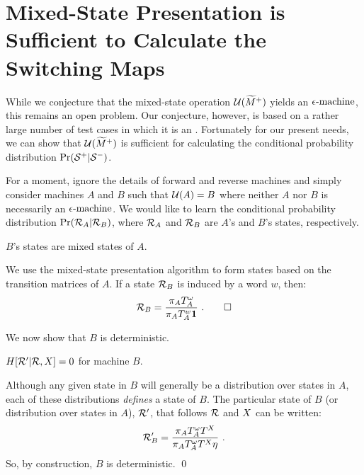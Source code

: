\ifx\master\undefined\fi


\chapter{Mixed-State Presentation is Sufficient to
Calculate the Switching Maps}
\label{app:EFromMixedState}

While we conjecture that the mixed-state operation $\mathcal{U}(\widetilde{M}^+)$
yields an $\mbox{$\epsilon$-machine}$, this remains an open problem. Our conjecture, however, is
based on a rather large number of test cases in which it is an \eM.
Fortunately for our present needs, we can show that
$\mathcal{U}(\widetilde{M}^+)$ is sufficient for
calculating the conditional probability distribution
$\Pr({\mathcal{S}}^{+} | {\mathcal{S}}^{-})$.

For a moment, ignore the details of forward and reverse machines and simply
consider machines $A$ and $B$ such that $\mathcal{U}(A) = B$ where neither $A$ nor $B$ is
necessarily an $\mbox{$\epsilon$-machine}$. We would like to learn the conditional probability
distribution $\Pr(\mathcal{R}_A | \mathcal{R}_B)$, where
$\mathcal{R}_A$ and $\mathcal{R}_B$ are $A$'s and $B$'s states,
respectively.

\begin{Prop}
$B$'s states are mixed states of $A$.
\end{Prop}

\begin{ProProp}
We use the mixed-state presentation algorithm to form states based on the
transition matrices of $A$. If a state $\mathcal{R}_B$ is induced by a
word $w$, then:
\begin{align*}
\mathcal{R}_B = \frac{\pi_A T_A^{\omega}}{\pi_A T_A^{w} \mathbf{1}} ~.
\qed
\end{align*}
\end{ProProp}

We now show that $B$ is deterministic.

\begin{Prop}
$H[\mathcal{R}' | \mathcal{R}, {X}] = 0$ for machine $B$.
\end{Prop}

\begin{ProProp}
Although any given state in $B$ will generally be a distribution over states
in $A$, each of these distributions \emph{defines} a state of $B$. The
particular state of $B$ (or distribution over states in $A$),
$\mathcal{R}'$, that follows $\mathcal{R}$ and ${X}$ can be
written:
\begin{align*}
\mathcal{R}'_B
  = \frac{\pi_A T_A^{\omega} T^{{X}}}
    {\pi_A T_A^{\omega} T^{{X}} \eta} ~.
\end{align*}
So, by construction, $B$ is deterministic.
\qed
\end{ProProp}

